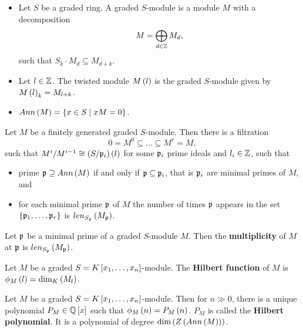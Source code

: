 \begin{definition}
\hfill
\begin{itemize}
\item Let $ S $ be a graded ring. A graded $ S $-module is a module $ M $ with a decomposition
$$ M = \bigoplus_{d \in \Z} M_d, $$
such that $ S_k \cdot M_d \subseteq M_{d + k} $.
\item Let $ l \in \Z $. The twisted module $ M\rb{l} $ is the graded $ S $-module given by $ M\rb{l}_k = M_{l + k} $.
\item $ Ann\rb{M} = \cb{x \in S \mid xM = 0} $.
\end{itemize}
\end{definition}

\begin{theorem}
Let $ M $ be a finitely generated graded $ S $-module. Then there is a filtration
$$ 0 = M^0 \subseteq \dots \subseteq M^r = M, $$
such that $ M^i / M^{i - 1} \cong \rb{S / \pp_i}\rb{l} $ for some $ \pp_i $ prime ideals and $ l_i \in \Z $, such that
\begin{itemize}
\item prime $ \pp \supseteq Ann\rb{M} $ if and only if $ \pp \subseteq \pp_i $, that is $ \pp_i $ are minimal primes of $ M $, and
\item for each minimal prime $ \pp $ of $ M $ the number of times $ \pp $ appears in the set $ \cb{\pp_1, \dots, \pp_r} $ is $ len_{S_\pp}\rb{M_\pp} $.
\end{itemize}
\end{theorem}


\begin{definition}
Let $ \pp $ be a minimal prime of a graded $ S $-module $ M $. Then the \textbf{multiplicity} of $ M $ at $ \pp $ is $ len_{S_\pp}\rb{M_\pp} $.
\end{definition}

\begin{definition}
Let $ M $ be a graded $ S = K\sb{x_1, \dots, x_n} $-module. The \textbf{Hilbert function} of $ M $ is $ \phi_M\rb{l} = \dim_K\rb{M_l} $.
\end{definition}

\begin{theorem}
Let $ M $ be a graded $ S = K\sb{x_1, \dots, x_n} $-module. Then for $ n \gg 0 $, there is a unique polynomial $ P_M \in \Q\sb{x} $ such that $ \phi_M\rb{n} = P_M\rb{n} $. $ P_M $ is called the \textbf{Hilbert polynomial}. It is a polynomial of degree $ \dim\rb{Z\rb{Ann\rb{M}}} $.
\end{theorem}


